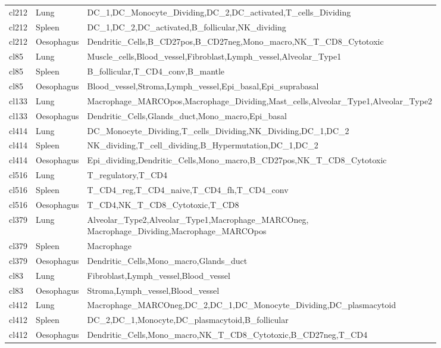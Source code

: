 \begin{table}[pht!]
\begin{tabular}{lll}
  cl212 & Lung & DC\_1,DC\_Monocyte\_Dividing,DC\_2,DC\_activated,T\_cells\_Dividing \\ 
  cl212 & Spleen & DC\_1,DC\_2,DC\_activated,B\_follicular,NK\_dividing \\ 
  cl212 & Oesophagus & Dendritic\_Cells,B\_CD27pos,B\_CD27neg,Mono\_macro,NK\_T\_CD8\_Cytotoxic \\ 
  cl85 & Lung & Muscle\_cells,Blood\_vessel,Fibroblast,Lymph\_vessel,Alveolar\_Type1 \\ 
  cl85 & Spleen & B\_follicular,T\_CD4\_conv,B\_mantle \\ 
  cl85 & Oesophagus & Blood\_vessel,Stroma,Lymph\_vessel,Epi\_basal,Epi\_suprabasal \\ 
  cl133 & Lung & Macrophage\_MARCOpos,Macrophage\_Dividing,Mast\_cells,Alveolar\_Type1,Alveolar\_Type2 \\ 
  cl133 & Oesophagus & Dendritic\_Cells,Glands\_duct,Mono\_macro,Epi\_basal \\ 
  cl414 & Lung & DC\_Monocyte\_Dividing,T\_cells\_Dividing,NK\_Dividing,DC\_1,DC\_2 \\ 
  cl414 & Spleen & NK\_dividing,T\_cell\_dividing,B\_Hypermutation,DC\_1,DC\_2 \\ 
  cl414 & Oesophagus & Epi\_dividing,Dendritic\_Cells,Mono\_macro,B\_CD27pos,NK\_T\_CD8\_Cytotoxic \\ 
  cl516 & Lung & T\_regulatory,T\_CD4 \\ 
  cl516 & Spleen & T\_CD4\_reg,T\_CD4\_naive,T\_CD4\_fh,T\_CD4\_conv \\ 
  cl516 & Oesophagus & T\_CD4,NK\_T\_CD8\_Cytotoxic,T\_CD8 \\ 
  cl379 & Lung & \specialcell[t]{Alveolar\_Type2,Alveolar\_Type1,Macrophage\_MARCOneg,\\Macrophage\_Dividing,Macrophage\_MARCOpos} \\ 
  cl379 & Spleen & Macrophage \\ 
  cl379 & Oesophagus & Dendritic\_Cells,Mono\_macro,Glands\_duct \\ 
  cl83 & Lung & Fibroblast,Lymph\_vessel,Blood\_vessel \\ 
  cl83 & Oesophagus & Stroma,Lymph\_vessel,Blood\_vessel \\
  cl412 & Lung & Macrophage\_MARCOneg,DC\_2,DC\_1,DC\_Monocyte\_Dividing,DC\_plasmacytoid \\ 
  cl412 & Spleen & DC\_2,DC\_1,Monocyte,DC\_plasmacytoid,B\_follicular \\ 
  cl412 & Oesophagus & Dendritic\_Cells,Mono\_macro,NK\_T\_CD8\_Cytotoxic,B\_CD27neg,T\_CD4 \\ 

\end{tabular}
\end{table}
